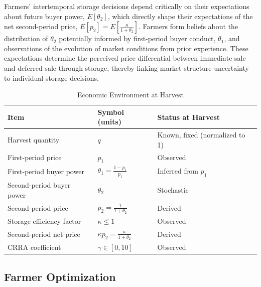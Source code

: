Farmers' intertemporal storage decisions depend critically on their expectations about future buyer power, $E[\theta_2]$, which directly shape their expectations of the net second-period price, $E[p_{2}] = E\!\left[\frac{\kappa}{1+\theta_2}\right]$. Farmers form beliefs about the distribution of $\theta_2$ potentially informed by first-period buyer conduct, $\theta_1$, and observations of the evolution of market conditions from prior experience. These expectations determine the perceived price differential between immediate sale and deferred sale through storage, thereby linking market-structure uncertainty to individual storage decisions.



\begin{table}[H]
\centering
\caption{Economic Environment at Harvest}
\label{tab:baseline model parameter table}
\begin{tabular}{lll}
\toprule
\textbf{Item} & \textbf{Symbol (units)} & \textbf{Status at Harvest} \\
\midrule
Harvest quantity & $q$ & Known, fixed (normalized to 1) \\
First-period price & $p_1$ & Observed \\
First-period buyer power & $\theta_1 = \frac{1 - p_1}{p_1}$ & Inferred from $p_1$ \\
Second-period buyer power & $\theta_2$ & Stochastic \\
Second-period price & $p_2 = \frac{1}{1 + \theta_2}$ & Derived \\
Storage efficiency factor & $\kappa \le 1$ & Observed \\
Second-period net price & $\kappa p_2 = \frac{\kappa}{1 + \theta_2}$ & Derived \\
CRRA coefficient & $\gamma \in [0,10]$ & Observed \\
\bottomrule
\end{tabular}
\end{table}



\subsection{Farmer Optimization}

